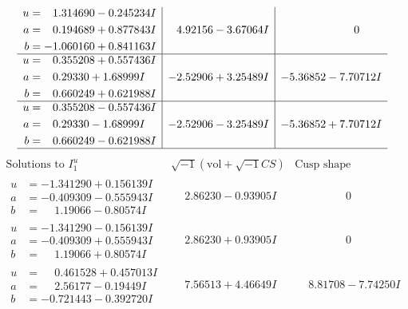 \documentclass[1p]{elsarticle_modified}
\theoremstyle{definition}
\newcommand{\I}{\sqrt{-1}}
\begin{document}
$$\begin{array}{c|c|c}
\begin{aligned}
u &= \phantom{-}1.314690 - 0.245234 I \\
a &= \phantom{-}0.194689 + 0.877843 I \\
b &= -1.060160 + 0.841163 I\end{aligned}
 & \phantom{-}4.92156 - 3.67064 I & \phantom{-0.000000 } 0 \\ \hline\begin{aligned}
u &= \phantom{-}0.355208 + 0.557436 I \\
a &= \phantom{-}0.29330 + 1.68999 I \\
b &= \phantom{-}0.660249 + 0.621988 I\end{aligned}
 & -2.52906 + 3.25489 I & -5.36852 - 7.70712 I \\ \hline\begin{aligned}
u &= \phantom{-}0.355208 - 0.557436 I \\
a &= \phantom{-}0.29330 - 1.68999 I \\
b &= \phantom{-}0.660249 - 0.621988 I\end{aligned}
 & -2.52906 - 3.25489 I & -5.36852 + 7.70712 I\\
 \hline 
 \end{array}$$\newpage$$\begin{array}{c|c|c}  
\text{Solutions to }I^u_{1}& \I (\text{vol} + \sqrt{-1}CS) & \text{Cusp shape}\\
 \hline 
\begin{aligned}
u &= -1.341290 + 0.156139 I \\
a &= -0.409309 - 0.555943 I \\
b &= \phantom{-}1.19066 - 0.80574 I\end{aligned}
 & \phantom{-}2.86230 - 0.93905 I & \phantom{-0.000000 } 0 \\ \hline\begin{aligned}
u &= -1.341290 - 0.156139 I \\
a &= -0.409309 + 0.555943 I \\
b &= \phantom{-}1.19066 + 0.80574 I\end{aligned}
 & \phantom{-}2.86230 + 0.93905 I & \phantom{-0.000000 } 0 \\ \hline\begin{aligned}
u &= \phantom{-}0.461528 + 0.457013 I \\
a &= \phantom{-}2.56177 - 0.19449 I \\
b &= -0.721443 - 0.392720 I\end{aligned}
 & \phantom{-}7.56513 + 4.46649 I & \phantom{-}8.81708 - 7.74250 I \\ \hline\begin{aligned}

\end{aligned}
\end{array}$$
\end{document}
